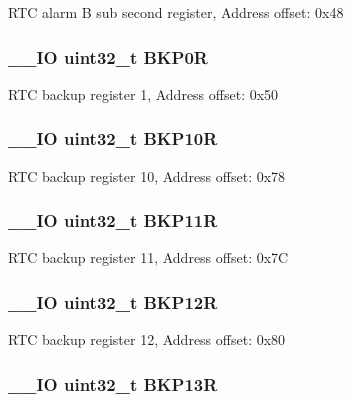 R\-T\-C alarm B sub second register, Address offset\-: 0x48 \hypertarget{struct_r_t_c___type_def_a4808ec597e5a5fefd8a83a9127dd1aec}{
\subsubsection[{B\-K\-P0\-R}]{\setlength{\rightskip}{0pt plus 5cm}\-\_\-\-\_\-\-I\-O uint32\-\_\-t B\-K\-P0\-R}}\label{struct_r_t_c___type_def_a4808ec597e5a5fefd8a83a9127dd1aec}
R\-T\-C backup register 1, Address offset\-: 0x50 \hypertarget{struct_r_t_c___type_def_aade2881a3e408bfd106b27f78bbbcfc9}{
\subsubsection[{B\-K\-P10\-R}]{\setlength{\rightskip}{0pt plus 5cm}\-\_\-\-\_\-\-I\-O uint32\-\_\-t B\-K\-P10\-R}}\label{struct_r_t_c___type_def_aade2881a3e408bfd106b27f78bbbcfc9}
R\-T\-C backup register 10, Address offset\-: 0x78 \hypertarget{struct_r_t_c___type_def_ac66d5e2d3459cff89794c47dbc8f7228}{
\subsubsection[{B\-K\-P11\-R}]{\setlength{\rightskip}{0pt plus 5cm}\-\_\-\-\_\-\-I\-O uint32\-\_\-t B\-K\-P11\-R}}\label{struct_r_t_c___type_def_ac66d5e2d3459cff89794c47dbc8f7228}
R\-T\-C backup register 11, Address offset\-: 0x7\-C \hypertarget{struct_r_t_c___type_def_a6f7eee5ae8a32c07f9c8fe14281bdaf3}{
\subsubsection[{B\-K\-P12\-R}]{\setlength{\rightskip}{0pt plus 5cm}\-\_\-\-\_\-\-I\-O uint32\-\_\-t B\-K\-P12\-R}}\label{struct_r_t_c___type_def_a6f7eee5ae8a32c07f9c8fe14281bdaf3}
R\-T\-C backup register 12, Address offset\-: 0x80 \hypertarget{struct_r_t_c___type_def_a6ed4c3a0d4588a75078e9f8e376b4d06}{
\subsubsection[{B\-K\-P13\-R}]{\setlength{\rightskip}{0pt plus 5cm}\-\_\-\-\_\-\-I\-O uint32\-\_\-t B\-K\-P13\-R}}\label{struct_r_t_c___type_def_a6ed4c3a0d4588a75078e9f8e376b4d06}
